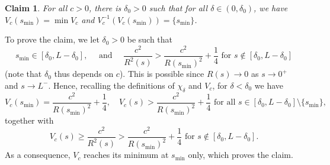 \documentclass[10pt]{amsart}
\newtheorem*{claim}{Claim}
\theoremstyle{definition}
\newcommand{\ce}{c}
\begin{document}
\begin{claim}
For all $\ce>0$, there is $\delta_0>0$ such that for all $\delta \in (0,\delta_0)$, we have $V_\ce(s_{\min})= \min V_\ce$ and $V_\ce^{-1}(V_\ce(s_{\min})) = \{ s_{\min}\}$.
\end{claim}

To prove the claim, we let $\delta_0>0$ be such that
\[
s_{\min} \in [\delta_0, L-\delta_0], \quad \text{ and }
\quad \frac{\ce^2}{R^2(s)} > \frac{\ce^2}{R(s_{\min})^2} +\frac14 \text{ for } s \notin [\delta_0, L-\delta_0]
\]
(note that $\delta_0$ thus depends on $\ce$).
This is possible since $R(s)\to 0$ as $s\to 0^+$ and $s\to L^-$.
Hence, recalling the definitions of $\chi_\delta$ and $V_\ce$, for $\delta < \delta_0$ we have
\[
V_\ce(s_{\min})= \frac{\ce^2}{R(s_{\min})^2} + \frac14, \quad V_\ce(s) > \frac{\ce^2}{R(s_{\min})^2} + \frac14 \text{ for all }s \in [\delta_0, L-\delta_0] \setminus \{s_{\min}\},
\]
together with
\[
V_\ce(s) \geq \frac{\ce^2}{R^2(s)} > \frac{\ce^2}{R(s_{\min})^2} + \frac14 \text{ for }s \notin [\delta_0, L-\delta_0].
\]
As a consequence, $V_\ce$ reaches its minimum at $s_{\min}$ only, which proves the claim.
\end{document}
